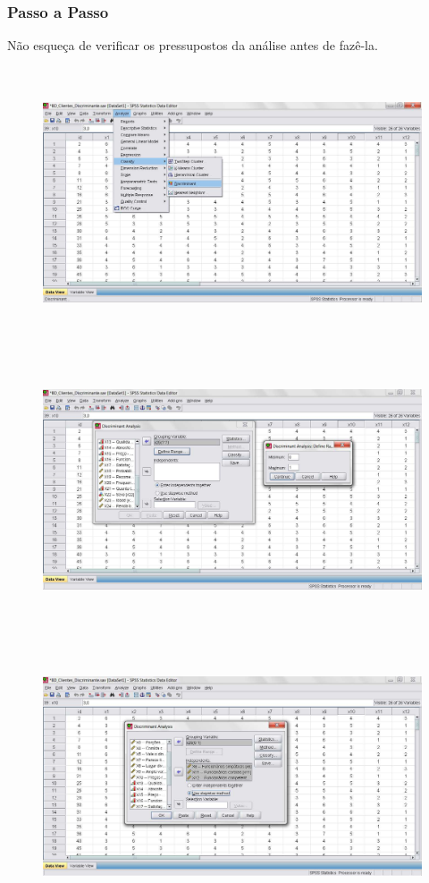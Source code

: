 		\subsubsection{Passo a Passo}

			Não esqueça de verificar os pressupostos da análise antes de fazê-la.

			\begin{figure}[H]
				\centering
				\includegraphics[height=8cm]{images/analise-discriminante_passo-a-passo_1}
			\end{figure}			
			
			\begin{figure}[H]
				\centering
				\includegraphics[height=8cm]{images/analise-discriminante_passo-a-passo_2}
			\end{figure}
			
			\begin{figure}[H]
				\centering
				\includegraphics[height=8cm]{images/analise-discriminante_passo-a-passo_3}
			\end{figure}

